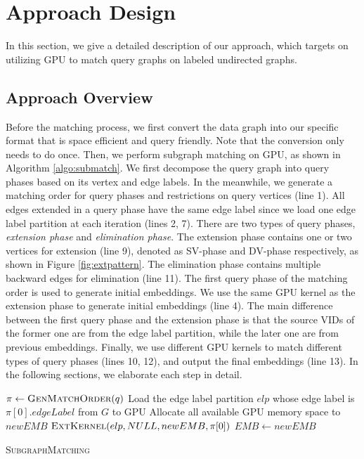 \section{Approach Design}
In this section, we give a detailed description of our approach, which targets on utilizing GPU to match query graphs on labeled undirected graphs.
\subsection{Approach Overview}
Before the matching process, we first convert the data graph into our specific format that is space efficient and query friendly. Note that the conversion only needs to do once. Then, we perform subgraph matching on GPU, as shown in Algorithm \ref{algo:submatch}. We first decompose the query graph into query phases based on its vertex and edge labels. In the meanwhile, we generate a matching order for query phases and restrictions on query vertices (line 1). All edges extended in a query phase have the same edge label since we load one edge label partition at each iteration (lines 2, 7). There are two types of query phases, \emph{extension phase} and \emph{elimination phase}. The extension phase contains one or two vertices for extension (line 9), denoted as SV-phase and DV-phase respectively, as shown in Figure \ref{fig:extpattern}. The elimination phase contains multiple backward edges for elimination (line 11). The first query phase of the matching order is used to generate initial embeddings. We use the same GPU kernel as the extension phase to generate initial embeddings (line 4). The main difference between the first query phase and the extension phase is that the source VIDs of the former one are from the edge label partition, while the later one are from previous embeddings. Finally, we use different GPU kernels to match different types of query phases (lines 10, 12), and output the final embeddings (line 13). In the following sections, we elaborate each step in detail.

\begin{algorithm}[t!]
$\pi \leftarrow \textsc{GenMatchOrder}(q)$\;
Load the edge label partition $elp$ whose edge label is $\pi[0].edgeLabel$ from $G$ to GPU\;
Allocate all available GPU memory space to $newEMB$\;
$\textsc{ExtKernel}(elp,NULL,newEMB,\pi[0])$\;
$EMB \leftarrow newEMB$\;
\caption{\textsc{SubgraphMatching}}
\label{algo:submatch}
\end{algorithm}


